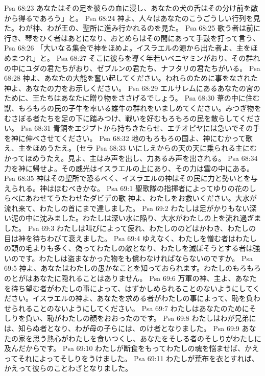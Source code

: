 Psa 68:23  あなたはその足を彼らの血に浸し、あなたの犬の舌はその分け前を敵から得るであろう」と。
Psa 68:24  神よ、人々はあなたのこうごうしい行列を見た。わが神、わが王の、聖所に進み行かれるのを見た。
Psa 68:25  歌う者は前に行き、琴をひく者はあとになり、おとめらはその間にあって手鼓を打って言う、
Psa 68:26  「大いなる集会で神をほめよ。イスラエルの源から出た者よ、主をほめまつれ」と。
Psa 68:27  そこに彼らを導く年若いベニヤミンがおり、その群れの中にユダの君たちがおり、ゼブルンの君たち、ナフタリの君たちがいる。
Psa 68:28  神よ、あなたの大能を奮い起してください。われらのために事をなされた神よ、あなたの力をお示しください。
Psa 68:29  エルサレムにあるあなたの宮のために、王たちはあなたに贈り物をささげるでしょう。
Psa 68:30  葦の中に住む獣、もろもろの民の子牛を率いる雄牛の群れをいましめてください。みつぎ物をむさぼる者たちを足の下に踏みつけ、戦いを好むもろもろの民を散らしてください。
Psa 68:31  青銅をエジプトから持ちきたらせ、エチオピヤには急いでその手を神に伸べさせてください。
Psa 68:32  地のもろもろの国よ、神にむかって歌え、主をほめうたえ。〔セラ
Psa 68:33  いにしえからの天の天に乗られる主にむかってほめうたえ。見よ、主はみ声を出し、力あるみ声を出される。
Psa 68:34  力を神に帰せよ。その威光はイスラエルの上にあり、その力は雲の中にある。
Psa 68:35  神はその聖所で恐るべく、イスラエルの神はその民に力と勢いとを与えられる。神はほむべきかな。
Psa 69:1  聖歌隊の指揮者によってゆりの花のしらべにあわせてうたわせたダビデの歌 神よ、わたしをお救いください。大水が流れ来て、わたしの首にまで達しました。
Psa 69:2  わたしは足がかりもない深い泥の中に沈みました。わたしは深い水に陥り、大水がわたしの上を流れ過ぎました。
Psa 69:3  わたしは叫びによって疲れ、わたしののどはかわき、わたしの目は神を待ちわびて衰えました。
Psa 69:4  ゆえなく、わたしを憎む者はわたしの頭の毛よりも多く、偽ってわたしの敵となり、わたしを滅ぼそうとする者は強いのです。わたしは盗まなかった物をも償わなければならないのですか。
Psa 69:5  神よ、あなたはわたしの愚かなことを知っておられます。わたしのもろもろのとがはあなたに隠れることはありません。
Psa 69:6  万軍の神、主よ、あなたを待ち望む者がわたしの事によって、はずかしめられることのないようにしてください。イスラエルの神よ、あなたを求める者がわたしの事によって、恥を負わせられることのないようにしてください。
Psa 69:7  わたしはあなたのためにそしりを負い、恥がわたしの顔をおおったのです。
Psa 69:8  わたしはわが兄弟には、知らぬ者となり、わが母の子らには、のけ者となりました。
Psa 69:9  あなたの家を思う熱心がわたしを食いつくし、あなたをそしる者のそしりがわたしに及んだからです。
Psa 69:10  わたしが断食をもってわたしの魂を悩ませば、かえってそれによってそしりをうけました。
Psa 69:11  わたしが荒布を衣とすれば、かえって彼らのことわざとなりました。
